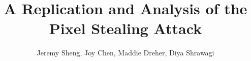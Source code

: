 \documentclass[sigplan,screen,10pt]{acmart}
\begin{document}
\title{A Replication and Analysis of the Pixel Stealing Attack}

\author{Jeremy Sheng, Joy Chen, Maddie Dreher, Diya Shrawagi}



\maketitle










\end{document}
